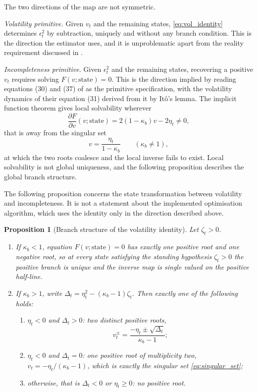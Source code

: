 \documentclass[11pt]{article}
\newtheorem{proposition}[proposition]{Proposition}
\theoremstyle{definition}
\begin{document}
The two directions of the map are not symmetric.

\emph{Volatility primitive.} Given $v_t$ and the remaining states, \eqref{eq:vol_identity} determines $\epsilon_t^2$ by subtraction, uniquely and without any branch condition. This is the direction the estimator uses, and it is unproblematic apart from the reality requirement discussed in .

\emph{Incompleteness primitive.} Given $\epsilon_t^2$ and the remaining states, recovering a positive $v_t$ requires solving $F(v;\text{state})=0$. This is the direction implied by reading equations (30) and (37) of \citet{BrandtSantaClara2002} as the primitive specification, with the volatility dynamics of their equation (31) derived from it by It\^o's lemma. The implicit function theorem gives local solvability wherever
\begin{equation}\label{eq:implicit_derivative}
\frac{\partial F}{\partial v}(v;\text{state})=2(1-\kappa_b)v-2\eta_t\ne0,
\end{equation}
that is away from the singular set
\begin{equation}\label{eq:singular_set}
v=\frac{\eta_t}{1-\kappa_b}
\qquad(\kappa_b\ne1),
\end{equation}
at which the two roots coalesce and the local inverse fails to exist. Local solvability is not global uniqueness, and the following proposition describes the global branch structure.

The following proposition concerns the state transformation between volatility and incompleteness. It is not a statement about the implemented optimisation algorithm, which uses the identity only in the direction described above.

\begin{proposition}[Branch structure of the volatility identity]\label{prop:vol_branch}
Let $\zeta_t>0$.
\begin{enumerate}[label=(\roman*)]
\item If $\kappa_b<1$, equation $F(v;\text{state})=0$ has exactly one positive root and one negative root, so at every state satisfying the standing hypothesis $\zeta_t>0$ the positive branch is unique and the inverse map is single valued on the positive half-line.
\item If $\kappa_b>1$, write $\Delta_t=\eta_t^2-(\kappa_b-1)\zeta_t$. Then exactly one of the following holds:
\begin{enumerate}[label=(\alph*)]
\item $\eta_t<0$ and $\Delta_t>0$: two \emph{distinct} positive roots,
\[
v_t^{\pm}=\frac{-\eta_t\pm\sqrt{\Delta_t}}{\kappa_b-1};
\]
\item $\eta_t<0$ and $\Delta_t=0$: one positive root of multiplicity two, $v_t=-\eta_t/(\kappa_b-1)$, which is exactly the singular set \eqref{eq:singular_set};
\item otherwise, that is $\Delta_t<0$ or $\eta_t\ge0$: no positive root.
\end{enumerate}
\end{enumerate}
\end{proposition}
\end{document}
